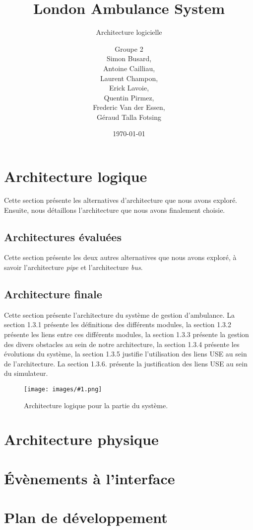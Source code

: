 \documentclass{report}
\title{London Ambulance System}
\subtitle{Architecture logicielle}
\author{\normalsize{Groupe 2}\\
\footnotesize{
Simon Busard, \\
Antoine Cailliau, \\
Laurent Champon,\\
Erick Lavoie, \\
Quentin Pirmez,\\
Frederic Van der Essen, \\
Géraud Talla Fotsing}}
\date{\today}
\newlength{\realtextwidth}
\newcommand{\insertfiguremargin}[2]{
	\begin{figure}[!h]
	\noindent\begin{minipage}[!h]{\marginparsep+\marginparwidth+\marginparpush+\textwidth}
		\begin{minipage}[t]{\realtextwidth}
			\vspace{0pt}
			\texttt{[image: images/\#1.png]}
		\end{minipage}
		\hspace{\marginparsep}
		\begin{minipage}[t]{\marginparwidth+\marginparpush}
			\vspace{0pt}
			\setcaptionwidth{\marginparwidth+\marginparpush}
			\caption{#2}\label{fig:#1}
			\setcaptionwidth{0.9\realtextwidth}
		\end{minipage}		
	\end{minipage}
	\end{figure}

}
\begin{document}
\setlength{\parskip}{1em}
\startdocument

\maketitle
\setcounter{tocdepth}{1}
\tableofcontents

\chapter{Architecture logique}
	
	Cette section présente les alternatives d'architecture que nous
	avons exploré. Ensuite, nous détaillons l'architecture que nous
	avons finalement choisie.

	\section{Architectures évaluées }
		
		Cette section présente les deux autres alternatives que nous 
		avons exploré, à savoir l'architecture \textit{pipe} et l'architecture
		\textit{bus}.
	
		
		
	
	\section{Architecture finale}
		Cette section présente l'architecture du système de gestion d'ambulance.
		La section 1.3.1 présente les définitions des différents modules, 
		la section 1.3.2 présente les liens entre ces différents modules, 
		la section 1.3.3 présente la gestion des divers obstacles au sein 
		de notre architecture, la section 1.3.4 présente les évolutions du 
		système, la section 1.3.5 justifie l'utilisation des liens USE au sein
		de l'architecture. La section 1.3.6. présente la justification des
		liens USE au sein du simulateur.
	
		\insertfiguremargin{logic-sys}{Architecture logique pour la partie du 
		système.}
		
		
		
		
		
\chapter{Architecture physique}
	

\chapter{Évènements à l'interface}
	

\chapter{Plan de développement}
	
\end{document}
